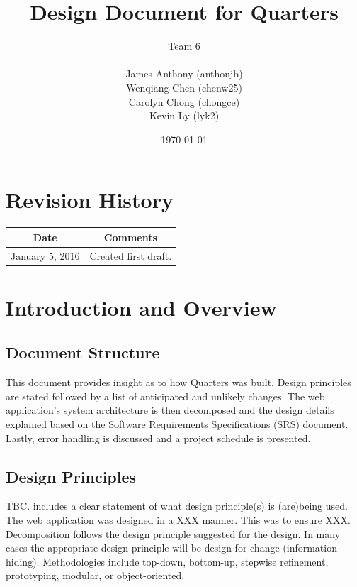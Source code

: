 \documentclass[12pt]{article}
\begin{document}
\title{Design Document for Quarters}
\author{Team 6\\ \\James Anthony (anthonjb)\\ Wenqiang Chen (chenw25)\\ Carolyn Chong
(chongce)\\ Kevin Ly (lyk2)}
\date{\today}

\maketitle

\pagebreak

\tableofcontents

\section*{Revision History}
\begin{tabular}{|c|c|}
\hline
\textbf{Date}  & \textbf{Comments} \\ \hline
January 5, 2016 & Created first draft. \\
\hline
\end{tabular}

\pagebreak


\section{Introduction and Overview}

\subsection{Document Structure}
This document provides insight as to how Quarters was built. Design principles are stated followed by a list of anticipated and unlikely changes. The web application's system architecture is then decomposed and the design details explained based on the Software Requirements Specifications (SRS) document. Lastly, error handling is discussed and a project schedule is presented.

\subsection{Design Principles}
TBC. includes a clear statement of what design principle(s) is (are)being used. The web application was designed in a XXX manner. This was to ensure XXX. Decomposition follows the design principle suggested for the design. In many cases the appropriate design principle will be design for change (information hiding). Methodologies include top-down, bottom-up, stepwise refinement, prototyping, modular, or object-oriented.
\end{document}
